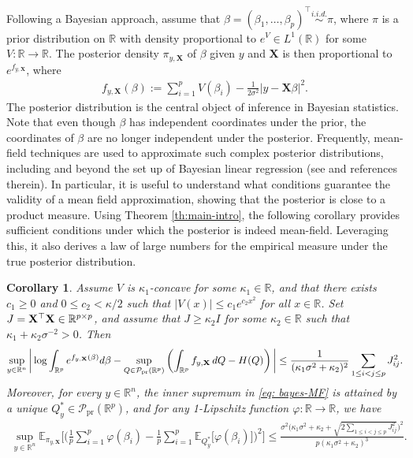 \documentclass[11pt,reqno]{amsart}
\numberwithin{equation}{section}
\newtheorem{corollary}[theorem]{Corollary}
\theoremstyle{definition}
\def\E{{\mathbb E}}
\def\R{{\mathbb R}}
\def\P{{\mathcal P}}
\def\Pprod{\P_{\mathrm{pr}}}
\begin{document}
Following a Bayesian approach, assume that $\beta =(\beta_1,\ldots,\beta_p)^\top\stackrel{i.i.d.}{\sim}\pi$, where $\pi$ is a prior distribution on $\R$ with density proportional to $e^V\in L^1(\R)$ for some $V: \R \to \R$. The posterior density $\pi_{y,\mathbf{X}}$ of $\beta$ given $y$ and $ \mathbf{X} $ is then  proportional to $e^{f_{y,\mathbf{X}}}$, where
\begin{align*}
	f_{y,\mathbf{X}}(\beta) := \sum_{i=1}^pV(\beta_i) - \frac{1}{2\sigma^2}\left|y-\mathbf{X}\beta\right|^2 .
\end{align*}
The posterior distribution is the central object of inference in Bayesian statistics. Note that even though ${ \beta}$ has independent coordinates under the prior, the coordinates of ${\beta}$ are no longer independent under the posterior. Frequently, mean-field techniques are used to approximate such complex posterior distributions, including and beyond the set up of Bayesian linear regression (see \cite{alquier2016properties,blei2017variational,ray2021variational,wainwright2008graphical,zhang2020theoretical}  and references therein). In particular, it is useful to understand what conditions guarantee the validity of a mean field approximation, showing that the posterior is close to a product measure. Using Theorem \ref{th:main-intro}, the following corollary provides sufficient conditions under which the posterior is indeed mean-field. Leveraging this, it also derives a law of large numbers for the empirical measure under the true posterior distribution.

\begin{corollary} \label{co:bayes}
	Assume $V$ is $\kappa_1$-concave for some $\kappa_1 \in \R$, and that there exists $ c_1 \ge 0 $ and $0 \le c_2  < \kappa/2$ such that $ |V(x)| \le  c_1 e^{c_2 x^2} $ for all $x \in \R$.
	Set $J={\bf X}^\top{\bf X}\in \R^{p\times p}$, and assume that $J \ge \kappa_2 I$ for some $\kappa _2 \in \R$ such that $\kappa_1+\kappa_2\sigma^{-2} > 0$. Then 
	\begin{align}
			\sup_{y\in \R^n}\bigg|\log \int_{\R^p}e^{f_{y,{\bf X}}(\beta)}d\beta-	\sup_{Q \in \Pprod(\R^p)} \left( \int_{\R^p} f_{y,{\bf X}}\,dQ- H(Q)\right)\bigg| \le \frac{1}{(\kappa_1 \sigma^2 + \kappa_2 )^2}\sum_{1 \le i < j \le p}J_{ij}^2.  \label{eq: bayes-MF}
		\end{align}
		Moreover, for every $y \in \R^n$, the inner supremum in \eqref{eq: bayes-MF} is attained by a unique $Q^*_y \in \Pprod(\R^p)$, and for any 1-Lipschitz function  $\varphi : \R \to \R$, we have
		\begin{align}
				\sup_{y\in \R^n}\E_{\pi_{y,\mathbf{X}}}\Bigg[\bigg(\frac{1}{p}\sum_{i=1}^p\varphi(\beta_i)-\frac{1}{p}\sum_{i=1}^p \E_{Q^*_y}\big[\varphi(\beta_i)\big]\bigg)^2\Bigg] \le \frac{\sigma^2\Big(\kappa_1\sigma^2 + \kappa_2 + \sqrt{2\sum_{1 \le i < j \le p}J_{ij}^2}\Big)^2}{p(\kappa_1\sigma^2 + \kappa_2)^3}. \label{eq: bayes-LLN}
		\end{align}
\end{corollary}
\end{document}

